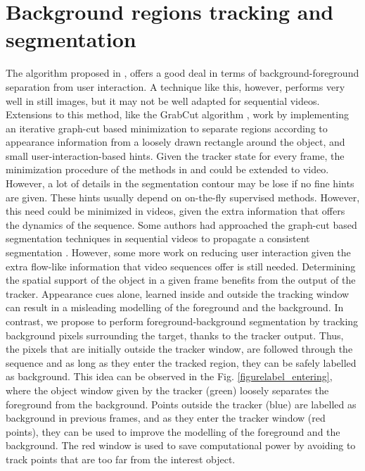 
\section{Background regions tracking and segmentation}
\label{sec:segm}
The algorithm proposed in \cite{c18}, offers a good deal in terms of
background-foreground separation from user interaction. A technique like this, however,
performs very well in still images, but it may not be well adapted for sequential videos. 
Extensions to this method, like the GrabCut algorithm \cite{c14}, work by implementing an iterative graph-cut based 
minimization to separate regions according to appearance information from a loosely drawn rectangle around the object, and small user-interaction-based hints. 
Given the tracker state for every frame, the minimization procedure of the methods in \cite{c18} and \cite{c14} could be extended to video. However, 
a lot of details in the segmentation contour may be lose if no fine hints are given.
These hints usually depend on on-the-fly supervised methods. However, this need could be minimized in videos, given the extra information that offers the dynamics of the sequence.
Some authors had approached the graph-cut based segmentation techniques in sequential
videos to propagate a consistent segmentation \cite{c15}. However, some more work on reducing user interaction given the extra flow-like information
that video sequences offer is still needed.
Determining the spatial support of the object in a given frame benefits from the output of the tracker. Appearance cues alone, learned inside and outside the tracking window 
can result in a misleading modelling of the foreground and the background. In contrast, we propose to perform foreground-background segmentation by tracking 
background pixels surrounding the target, thanks to the tracker output. Thus, the pixels that are initially outside the tracker window, 
are followed through the sequence and as long as they enter the tracked region, they can be safely labelled as background. 
This idea can be observed in the Fig.  \ref{figurelabel_entering}, 
where the object window given by the tracker (green) loosely separates the foreground from the background. Points outside the tracker (blue) are labelled as background in previous frames, and as they enter the tracker window (red points), they can be used to improve the modelling  of the foreground and the background. 
The red window is used to save computational power by avoiding to track points that are too far from the interest object.

